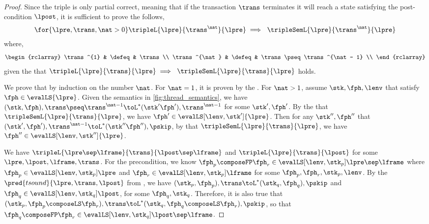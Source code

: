 \begin{proof}

Since the triple is only partial correct, meaning that if the transaction \( \trans \) terminates it will reach a state satisfying the post-condition \( \lpost \), it is sufficient to prove the follows,
\[
    \for{\lpre, \trans, \nat > 0} \tripleL{\lpre}{\trans^{\nat}}{\lpre} \implies \ \tripleSemL{\lpre}{\trans^{\nat}}{\lpre} \\
\]
where,
\[
\begin{rclarray}
    \trans^{1} & \defeq  & \trans \\
    \trans^{\nat} & \defeq  & \trans \pseq \trans^{\nat - 1} \\
\end{rclarray}
\]
given the \ih that \(\tripleL{\lpre}{\trans}{\lpre} \implies \ \tripleSemL{\lpre}{\trans}{\lpre} \) holds.

We prove that by induction on the number \( \nat \).
For \( \nat = 1 \), it is proven by the \ih.
For \( \nat > 1 \), assume \( \stk, \fph, \lenv \) that satisfy \( \fph \in \evalLS{\lpre} \). 
Given the semantics in \fig \ref{fig:thread_semantics}, we have \( (\stk, \fph), \trans \pseq \trans^{\nat - 1} \toL^{*} (\stk' \fph'), \trans^{\nat - 1} \) for some \( \stk', \fph' \).
By the \ih that \(\tripleSemL{\lpre}{\trans}{\lpre} \), we have \( \fph' \in \evalLS[\lenv, \stk']{\lpre} \).
Then for any \( \stk'', \fph'' \) that \( (\stk', \fph'), \trans^{\nat - 1} \toL^{*} (\stk'' \fph''), \pskip \), by \ih that \( \tripleSemL{\lpre}{\trans}{\lpre} \), we have \( \fph'' \in \evalLS[\lenv, \stk'']{\lpre} \).

We have \( \tripleL{\lpre \sep \lframe }{\trans}{\lpost \sep \lframe} \) and \( \tripleL{\lpre}{\trans}{\lpost} \) for some \( \lpre, \lpost, \lframe, \trans\).
For the precondition, we know \( \fph_{p} \composeFP \fph_{r} \in \evalLS[\lenv, \stk_{p}]{\lpre \sep \lframe} \) where \(  \fph_{p} \in \evalLS[\lenv, \stk_{p}]{\lpre} \) and \( \fph_{r} \in \evalLS[\lenv, \stk_{p}]{\lframe} \) for some \( \fph_{p}, \fph_{r}, \stk_{p}, \lenv \).
By the \( \pred{tsound}{\lpre, \trans, \lpost } \) from \ih, we have \( ( \stk_{p}, \fph_{p} ), \trans \toL^{*} (\stk_{q}, \fph_{q}), \pskip \) and \( \fph_{q} \in \evalLS[\lenv, \stk_{q}]{\lpost}\), for some \( \fph_{q}, \stk_{q} \).
Therefore, it is also true that \( ( \stk_{p}, \fph_{p} \composeLS \fph_{r} ), \trans \toL^{*} (\stk_{q}, \fph_{q} \composeLS \fph_{r}), \pskip \), so that \( \fph_{q} \composeFP \fph_{r} \in \evalLS[\lenv, \stk_{q}]{\lpost \sep \lframe} \).

\end{proof}

